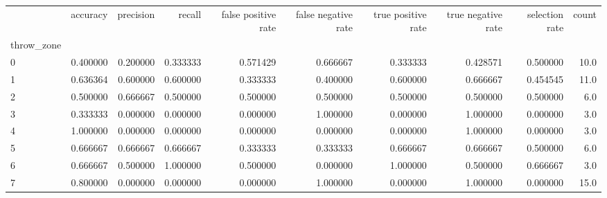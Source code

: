 \begin{tabular}{lrrrrrrrrr}
\toprule
{} &  accuracy &  precision &    recall &  false positive rate &  false negative rate &  true positive rate &  true negative rate &  selection rate &  count \\
throw\_zone &           &            &           &                      &                      &                     &                     &                 &        \\
\midrule
0          &  0.400000 &   0.200000 &  0.333333 &             0.571429 &             0.666667 &            0.333333 &            0.428571 &        0.500000 &   10.0 \\
1          &  0.636364 &   0.600000 &  0.600000 &             0.333333 &             0.400000 &            0.600000 &            0.666667 &        0.454545 &   11.0 \\
2          &  0.500000 &   0.666667 &  0.500000 &             0.500000 &             0.500000 &            0.500000 &            0.500000 &        0.500000 &    6.0 \\
3          &  0.333333 &   0.000000 &  0.000000 &             0.000000 &             1.000000 &            0.000000 &            1.000000 &        0.000000 &    3.0 \\
4          &  1.000000 &   0.000000 &  0.000000 &             0.000000 &             0.000000 &            0.000000 &            1.000000 &        0.000000 &    3.0 \\
5          &  0.666667 &   0.666667 &  0.666667 &             0.333333 &             0.333333 &            0.666667 &            0.666667 &        0.500000 &    6.0 \\
6          &  0.666667 &   0.500000 &  1.000000 &             0.500000 &             0.000000 &            1.000000 &            0.500000 &        0.666667 &    3.0 \\
7          &  0.800000 &   0.000000 &  0.000000 &             0.000000 &             1.000000 &            0.000000 &            1.000000 &        0.000000 &   15.0 \\
\bottomrule
\end{tabular}
